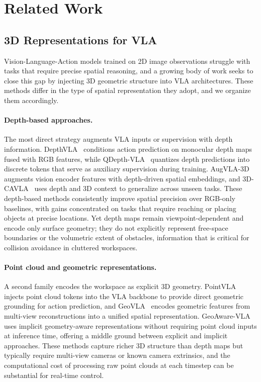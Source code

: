 \section{Related Work}
\label{sec:related}

\subsection{3D Representations for VLA}
\label{sec:rw_spatial}

Vision-Language-Action models trained on 2D image observations struggle with tasks that require precise spatial reasoning, and a growing body of work seeks to close this gap by injecting 3D geometric structure into VLA architectures. These methods differ in the type of spatial representation they adopt, and we organize them accordingly.

\paragraph{Depth-based approaches.}
The most direct strategy augments VLA inputs or supervision with depth information. DepthVLA~\cite{an2025depthvla} conditions action prediction on monocular depth maps fused with RGB features, while QDepth-VLA~\cite{qdepthvla2025} quantizes depth predictions into discrete tokens that serve as auxiliary supervision during training. AugVLA-3D~\cite{augvla3d2026} augments vision encoder features with depth-driven spatial embeddings, and 3D-CAVLA~\cite{3dcavla2025} uses depth and 3D context to generalize across unseen tasks. These depth-based methods consistently improve spatial precision over RGB-only baselines, with gains concentrated on tasks that require reaching or placing objects at precise locations. Yet depth maps remain viewpoint-dependent and encode only surface geometry; they do not explicitly represent free-space boundaries or the volumetric extent of obstacles, information that is critical for collision avoidance in cluttered workspaces.

\paragraph{Point cloud and geometric representations.}
A second family encodes the workspace as explicit 3D geometry. PointVLA~\cite{pointvla2025} injects point cloud tokens into the VLA backbone to provide direct geometric grounding for action prediction, and GeoVLA~\cite{geovla2025} encodes geometric features from multi-view reconstructions into a unified spatial representation. GeoAware-VLA~\cite{geoaware2025} uses implicit geometry-aware representations without requiring point cloud inputs at inference time, offering a middle ground between explicit and implicit approaches. These methods capture richer 3D structure than depth maps but typically require multi-view cameras or known camera extrinsics, and the computational cost of processing raw point clouds at each timestep can be substantial for real-time control.

